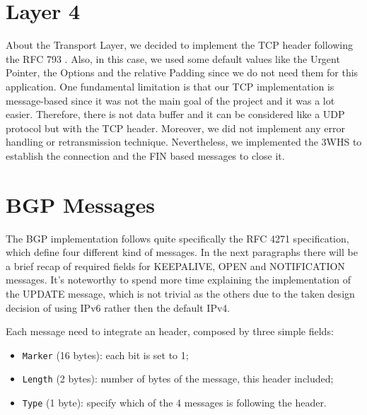 \section{Layer 4}\label{layer4}
About the Transport Layer, we decided to implement the TCP header following the RFC 793 \cite{rfc793}.
Also, in this case, we used some default values like the Urgent Pointer, the Options and the relative Padding since we do not need them for this application.\newline
One fundamental limitation is that our TCP implementation is message-based since it was not the main goal of the project and it was a lot easier.
Therefore, there is not data buffer and it can be considered like a UDP protocol but with the TCP header.
Moreover, we did not implement any error handling or retransmission technique.\newline
Nevertheless, we implemented the 3WHS to establish the connection and the FIN based messages to close it.

\section{BGP Messages}\label{BGPMex}
The BGP implementation follows quite specifically the RFC 4271 specification, which define four different kind of messages.
In the next paragraphs there will be a brief recap of required fields for KEEPALIVE, OPEN and NOTIFICATION messages. It's noteworthy to spend more time explaining the implementation of the UPDATE message, which is not trivial as the others due to the taken design decision of using IPv6 rather then the default IPv4.

Each message need to integrate an header, composed by three simple fields:
\begin{itemize}
    \item \texttt{Marker} (16 bytes): each bit is set to 1;
    \item \texttt{Length} (2 bytes): number of bytes of the message, this header included;
    \item \texttt{Type} (1 byte): specify which of the 4 messages is following the header.
\end{itemize}

